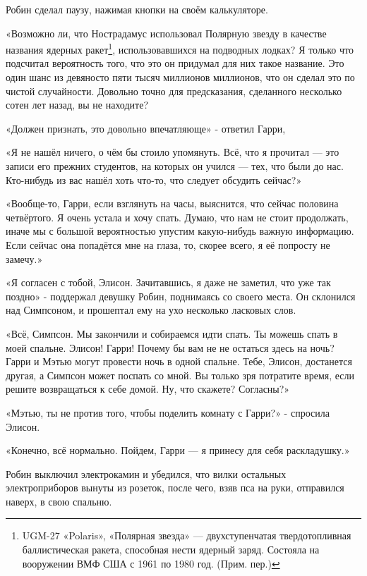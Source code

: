 \documentclass[a4paper,12pt]{book}
\begin{document}
\par
Робин сделал паузу, нажимая кнопки на своём калькуляторе.
\par
«Возможно ли, что Нострадамус использовал Полярную звезду в качестве названия ядерных ракет\footnote[1]{UGM-27 «Polaris», «Полярная звезда» — двухступенчатая твердотопливная баллистическая ракета, способная нести ядерный заряд. Состояла на вооружении ВМФ США с 1961 по 1980 год. (Прим. пер.)}, использовавшихся на подводных лодках? Я только что подсчитал вероятность того, что это он придумал для них такое название. Это один шанс из девяносто пяти тысяч миллионов миллионов, что он сделал это по чистой случайности. Довольно точно для предсказания, сделанного несколько сотен лет назад, вы не находите?
\par
«Должен признать, это довольно впечатляюще» - ответил Гарри,
\par
«Я не нашёл ничего, о чём бы стоило упомянуть. Всё, что я прочитал — это записи его прежних студентов, на которых он учился — тех, что были до нас. Кто-нибудь из вас нашёл хоть что-то, что следует обсудить сейчас?»
\par
«Вообще-то, Гарри, если взглянуть на часы, выяснится, что сейчас половина четвёртого. Я очень устала и хочу спать. Думаю, что нам не стоит продолжать, иначе мы с большой вероятностью упустим какую-нибудь важную информацию. Если сейчас она попадётся мне на глаза, то, скорее всего, я её попросту не замечу.»
\par
«Я согласен с тобой, Элисон. Зачитавшись, я даже не заметил, что уже так поздно» - поддержал девушку Робин, поднимаясь со своего места. Он склонился над Симпсоном, и прошептал ему на ухо несколько ласковых слов.
\par
«Всё, Симпсон. Мы закончили и собираемся идти спать. Ты можешь спать в моей спальне. Элисон! Гарри! Почему бы вам не не остаться здесь на ночь? Гарри и Мэтью могут провести ночь в одной спальне. Тебе, Элисон, достанется другая, а Симпсон может поспать со мной. Вы только зря потратите время, если решите возвращаться к себе домой. Ну, что скажете? Согласны?»
\par
«Мэтью, ты не против того, чтобы поделить комнату с Гарри?» - спросила Элисон.
\par
«Конечно, всё нормально. Пойдем, Гарри — я принесу для себя раскладушку.»
\par
Робин выключил электрокамин и убедился, что вилки остальных электроприборов вынуты из розеток, после чего, взяв пса на руки, отправился наверх, в свою спальню.\\
\end{document}
